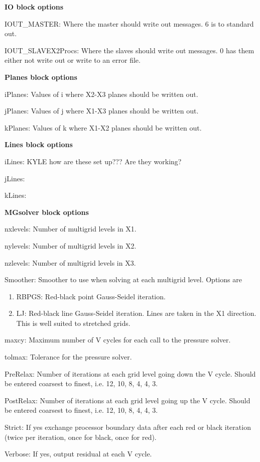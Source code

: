 \textbf{IO block options}
\begin{description}
  \item IOUT\_MASTER: Where the master should write out messages. 6 is to 
        standard out.
  \item IOUT\_SLAVEX2Procs: Where the slaves should write out messages. 
        0 has them either not write out or write to an error file.
\end{description}

\textbf{Planes block options}
\begin{description}
  \item iPlanes: Values of i where X2-X3 planes should be written out.
  \item jPlanes: Values of j where X1-X3 planes should be written out.
  \item kPlanes: Values of k where X1-X2 planes should be written out.
\end{description}

\textbf{Lines block options}
\begin{description}
  \item iLines: KYLE how are these set up??? Are they working?
  \item jLines: 
  \item kLines: 
\end{description}

\textbf{MGsolver block options}
\begin{description}
  \item nxlevels: Number of multigrid levels in X1.
  \item nylevels: Number of multigrid levels in X2.
  \item nzlevels: Number of multigrid levels in X3.
  \item Smoother: Smoother to use when solving at each multigrid level. Options are 
  \begin{enumerate}
    \item RBPGS: Red-black point Gauss-Seidel iteration. 
    \item LJ: Red-black line Gauss-Seidel iteration. Lines are taken in the X1
          direction. This is well suited to stretched grids. 
  \end{enumerate}
  \item maxcy: Maximum number of V cycles for each call to the pressure solver.
  \item tolmax: Tolerance for the pressure solver.
  \item PreRelax: Number of iterations at each grid level going down the V 
        cycle. Should be entered coarsest to finest, i.e. 12, 10, 8, 4, 4, 3.
  \item PostRelax: Number of iterations at each grid level going up the V 
        cycle. Should be entered coarsest to finest, i.e. 12, 10, 8, 4, 4, 3.
  \item Strict: If yes exchange processor boundary data after each red or 
        black iteration (twice per iteration, once for black, once for red).
  \item Verbose: If yes, output residual at each V cycle. 
\end{description}

